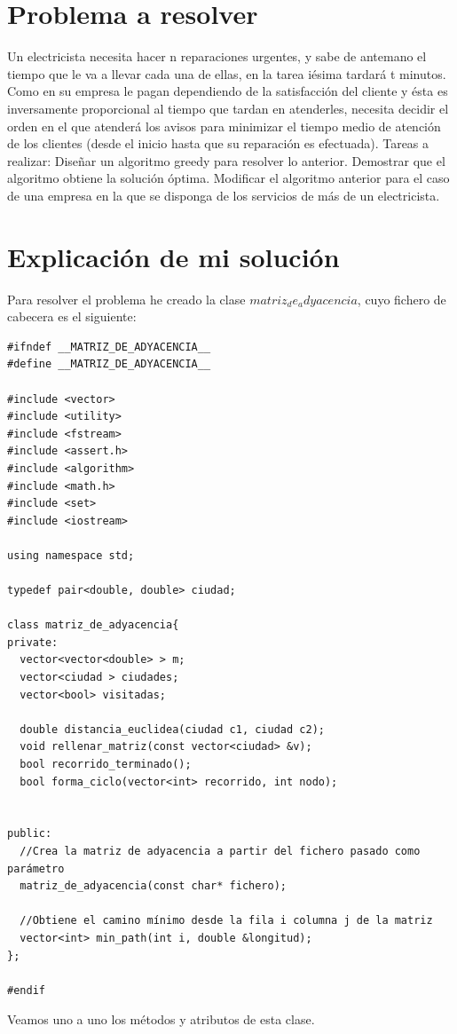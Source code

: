 \documentclass[12pt]{article}
\begin{document}
\section{Problema a resolver}
Un electricista necesita hacer n reparaciones urgentes, y sabe de antemano el tiempo que le va a llevar cada
una de ellas, en la tarea iésima tardará t minutos. Como en su empresa le pagan dependiendo de la satisfacción del cliente y ésta es inversamente proporcional al tiempo que tardan en atenderles, necesita decidir el orden en el que atenderá los avisos para minimizar el tiempo medio de atención de los clientes (desde el inicio hasta que su reparación es efectuada). 
Tareas a realizar: Diseñar un algoritmo greedy para resolver lo anterior. Demostrar que el algoritmo obtiene la solución óptima. Modificar el algoritmo anterior para el caso de una empresa en la que se disponga de los servicios de más de un electricista.

\section{Explicación de mi solución}
Para resolver el problema he creado la clase $matriz_de_adyacencia$, cuyo fichero de cabecera es el siguiente: 

\begin{lstlisting}
#ifndef __MATRIZ_DE_ADYACENCIA__
#define __MATRIZ_DE_ADYACENCIA__

#include <vector>
#include <utility>
#include <fstream>
#include <assert.h>
#include <algorithm>
#include <math.h>
#include <set>
#include <iostream>

using namespace std;

typedef pair<double, double> ciudad;

class matriz_de_adyacencia{
private:
  vector<vector<double> > m;
  vector<ciudad > ciudades;
  vector<bool> visitadas;

  double distancia_euclidea(ciudad c1, ciudad c2);
  void rellenar_matriz(const vector<ciudad> &v);
  bool recorrido_terminado();
  bool forma_ciclo(vector<int> recorrido, int nodo);


public:
  //Crea la matriz de adyacencia a partir del fichero pasado como parámetro
  matriz_de_adyacencia(const char* fichero);

  //Obtiene el camino mínimo desde la fila i columna j de la matriz
  vector<int> min_path(int i, double &longitud);
};

#endif
\end{lstlisting} 
Veamos uno a uno los métodos y atributos de esta clase.
\end{document}
